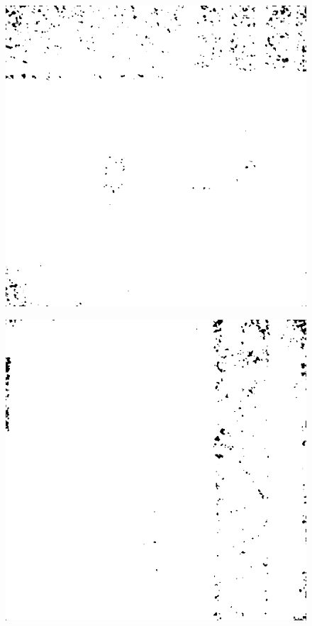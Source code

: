 \begin{figure}[H]
\begin{minipage}[t]{0.245\textwidth}
    \includegraphics[width = \textwidth]{result/SPC_NRQA/h37_512_m30.PNG}
    \subcaption{}
    \label{fig:half2}
\end{minipage}
\begin{minipage}[t]{0.245\textwidth}
    \includegraphics[width=1\textwidth]{result/SPC_NRQA/h43_512_m30.PNG}

\end{minipage}
\end{figure}

